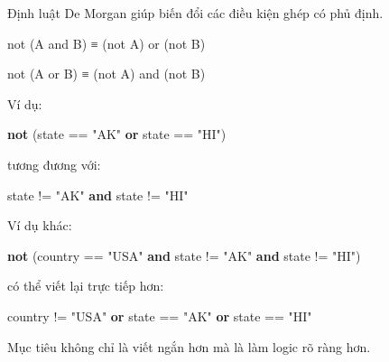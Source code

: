 \documentclass[
  11pt,
  a4paper,
]{article}
\newenvironment{Shaded}{}{}
\newcommand{\KeywordTok}[1]{\textcolor[rgb]{0.00,0.44,0.13}{\textbf{#1}}}
\newcommand{\NormalTok}[1]{#1}
\newcommand{\OperatorTok}[1]{\textcolor[rgb]{0.40,0.40,0.40}{#1}}
\newcommand{\StringTok}[1]{\textcolor[rgb]{0.25,0.44,0.63}{#1}}
\begin{document}
Định luật De Morgan giúp biến đổi các điều kiện ghép có phủ định.

\begin{Shaded}
\begin{Highlighting}[]
\NormalTok{not (A and B)  ≡  (not A) or (not B)}

\NormalTok{not (A or B)   ≡  (not A) and (not B)}
\end{Highlighting}
\end{Shaded}

Ví dụ:

\begin{Shaded}
\begin{Highlighting}[]
\KeywordTok{not}\NormalTok{ (state }\OperatorTok{==} \StringTok{"AK"} \KeywordTok{or}\NormalTok{ state }\OperatorTok{==} \StringTok{"HI"}\NormalTok{)}
\end{Highlighting}
\end{Shaded}

tương đương với:

\begin{Shaded}
\begin{Highlighting}[]
\NormalTok{state }\OperatorTok{!=} \StringTok{"AK"} \KeywordTok{and}\NormalTok{ state }\OperatorTok{!=} \StringTok{"HI"}
\end{Highlighting}
\end{Shaded}

Ví dụ khác:

\begin{Shaded}
\begin{Highlighting}[]
\KeywordTok{not}\NormalTok{ (country }\OperatorTok{==} \StringTok{"USA"} \KeywordTok{and}\NormalTok{ state }\OperatorTok{!=} \StringTok{"AK"} \KeywordTok{and}\NormalTok{ state }\OperatorTok{!=} \StringTok{"HI"}\NormalTok{)}
\end{Highlighting}
\end{Shaded}

có thể viết lại trực tiếp hơn:

\begin{Shaded}
\begin{Highlighting}[]
\NormalTok{country }\OperatorTok{!=} \StringTok{"USA"} \KeywordTok{or}\NormalTok{ state }\OperatorTok{==} \StringTok{"AK"} \KeywordTok{or}\NormalTok{ state }\OperatorTok{==} \StringTok{"HI"}
\end{Highlighting}
\end{Shaded}

Mục tiêu không chỉ là viết ngắn hơn mà là làm logic rõ ràng hơn.
\end{document}
